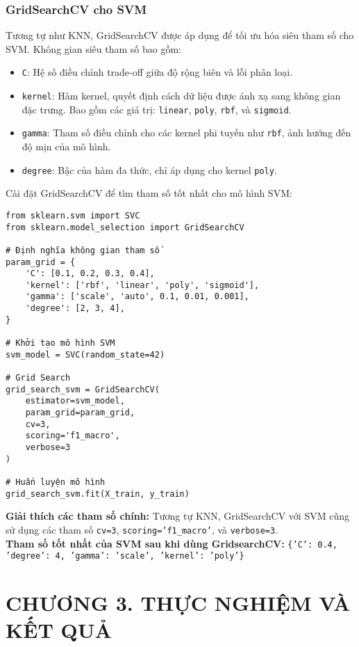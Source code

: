 \documentclass[a4paper,12pt]{article}
\begin{document}
\subsubsection{GridSearchCV cho SVM}  
\hspace{5mm}Tương tự như KNN, GridSearchCV được áp dụng để tối ưu hóa siêu tham số cho SVM. Không gian siêu tham số bao gồm:  
\begin{itemize}
    \item \texttt{C}: Hệ số điều chỉnh trade-off giữa độ rộng biên và lỗi phân loại.
    \item \texttt{kernel}: Hàm kernel, quyết định cách dữ liệu được ánh xạ sang không gian đặc trưng. Bao gồm các giá trị: \texttt{linear}, \texttt{poly}, \texttt{rbf}, và \texttt{sigmoid}.
    \item \texttt{gamma}: Tham số điều chỉnh cho các kernel phi tuyến như \texttt{rbf}, ảnh hưởng đến độ mịn của mô hình.
    \item \texttt{degree}: Bậc của hàm đa thức, chỉ áp dụng cho kernel \texttt{poly}.
\end{itemize}

Cài đặt GridSearchCV để tìm tham số tốt nhất cho mô hình SVM:

\begin{verbatim}
from sklearn.svm import SVC
from sklearn.model_selection import GridSearchCV

# Định nghĩa không gian tham số
param_grid = {
    'C': [0.1, 0.2, 0.3, 0.4],
    'kernel': ['rbf', 'linear', 'poly', 'sigmoid'],
    'gamma': ['scale', 'auto', 0.1, 0.01, 0.001],
    'degree': [2, 3, 4],
}

# Khởi tạo mô hình SVM
svm_model = SVC(random_state=42)

# Grid Search
grid_search_svm = GridSearchCV(
    estimator=svm_model,
    param_grid=param_grid,
    cv=3,
    scoring='f1_macro',
    verbose=3
)

# Huấn luyện mô hình
grid_search_svm.fit(X_train, y_train)
\end{verbatim}

\noindent \textbf{Giải thích các tham số chính:}  
Tương tự KNN, GridSearchCV với SVM cũng sử dụng các tham số \texttt{cv=3}, \texttt{scoring='f1\_macro'}, và \texttt{verbose=3}.\\[2mm]
\noindent \textbf{Tham số tốt nhất của SVM sau khi dùng GridsearchCV:} \texttt{\{'C': 0.4, 'degree': 4, 'gamma': 'scale', 'kernel': 'poly'\}}

\newpage
\section*{\centering CHƯƠNG 3. THỰC NGHIỆM VÀ KẾT QUẢ}
\vspace{1cm}
\setcounter{section}{3}
\setcounter{subsection}{0}
\end{document}
